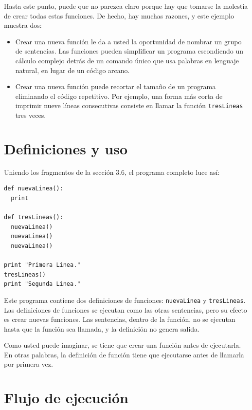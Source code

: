 Hasta este punto, puede que no parezca claro porque hay que tomarse la molestia
de crear todas estas funciones. De hecho, hay muchas razones, y este ejemplo 
muestra dos:

\begin{itemize}

\item Crear una nueva función le da a usted la oportunidad de nombrar un
grupo de sentencias. Las funciones pueden simplificar un programa escondiendo
un cálculo complejo detrás de un comando único que usa palabras en lenguaje
natural, en lugar de un código arcano.

\item Crear una nueva función puede recortar el tamaño de un programa eliminando
el código repetitivo. Por ejemplo, una forma más corta de imprimir nueve
líneas consecutivas consiste en llamar la función \texttt{tresLineas} tres veces.

\end{itemize}



\section{Definiciones y uso}

Uniendo los fragmentos de la sección 3.6, el programa completo luce así:

\beforeverb
\begin{verbatim}
def nuevaLinea():
  print

def tresLineas():
  nuevaLinea()
  nuevaLinea()
  nuevaLinea()

print "Primera Linea."
tresLineas()
print "Segunda Linea."
\end{verbatim}
\afterverb
%
Este programa contiene dos definiciones de funciones: \texttt{nuevaLinea} y
\texttt{tresLineas}.  Las definiciones de funciones se ejecutan como 
las otras sentencias, pero su efecto es crear nuevas funciones. Las
sentencias, dentro de la función, no se ejecutan hasta que la función
sea llamada, y la definición no genera salida.

Como usted puede imaginar, se tiene que crear una función antes de
ejecutarla. En otras palabras, la definición de función tiene que
ejecutarse antes de llamarla por primera vez.



\section{Flujo de ejecución}

